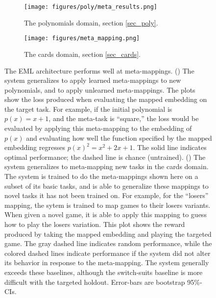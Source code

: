 \documentclass{article}
\begin{document}
\begin{figure}
\centering
\begin{subfigure}{0.5\textwidth}
\texttt{[image: figures/poly/meta\_results.png]}
\caption{The polynomials domain, section \ref{sec_poly}.}
\label{poly_meta_map_results_examples}
\end{subfigure}%
\begin{subfigure}{0.5\textwidth}
\texttt{[image: figures/meta\_mapping.png]}
\caption{The cards domain, section \ref{sec_cards}.}
\label{cards_meta_map_results_examples}
\end{subfigure}%
\caption{The EML architecture performs well at meta-mappings. () The system generalizes to apply learned meta-mappings to new polynomials, and to apply unlearned meta-mappings. The plots show the loss produced when evaluating the mapped embedding on the target task. For example, if the initial polynomial is $p(x) = x + 1$, and the meta-task is ``square,'' the loss would be evaluated by applying this meta-mapping to the embedding of $p(x)$ and evaluating how well the function specified by the mapped embedding regresses $p(x)^2 = x^2 + 2x + 1$. The solid line indicates optimal performance; the dashed line is chance (untrained).
() The system generalizes to meta-mapping new tasks in the cards domain. The system is trained to do the meta-mappings shown here on a subset of its basic tasks, and is able to generalize these mappings to novel tasks it has not been trained on. For example, for the ``losers'' mapping, the sytem is trained to map games to their losers variants. When given a novel game, it is able to apply this mapping to guess how to play the losers variation. This plot shows the reward produced by taking the mapped embedding and playing the targeted game. The gray dashed line indicates random performance, while the colored dashed lines indicate performance if the system did not alter its behavior in response to the meta-mapping. The system generally exceeds these baselines, although the switch-suits baseline is more difficult with the targeted holdout. 
Error-bars are bootstrap 95\%-CIs.} 
\label{meta_map_results}
\end{figure}
\end{document}

